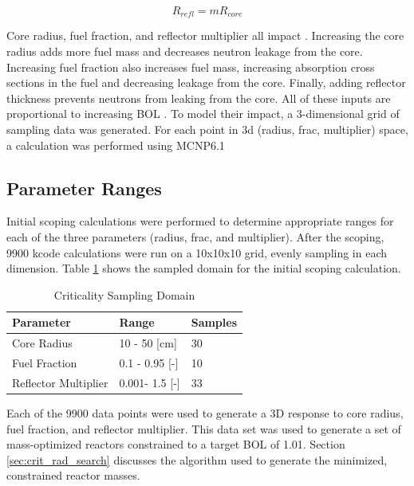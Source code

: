 \begin{equation}
    \label{eq:ref_mult}
    R_{refl} = mR_{core}
\end{equation}

Core radius, fuel fraction, and reflector multiplier all impact \keff.
Increasing the core radius adds more fuel mass and decreases neutron leakage 
from the core. Increasing fuel fraction also increases fuel mass, increasing
absorption cross sections in the fuel and decreasing leakage from the core.
Finally, adding reflector thickness prevents neutrons from leaking from the
core. All of these inputs are proportional to increasing BOL \keff. To model
their impact, a 3-dimensional grid of sampling data was generated. For each
point in 3d (radius, frac, multiplier) space, a \keff calculation was
performed using MCNP6.1


\subsection{Parameter Ranges}
Initial scoping calculations were performed to determine appropriate ranges for
each of the three parameters (radius, frac, and multiplier). After the scoping,
9900 kcode
calculations were run on a 10x10x10 grid, evenly sampling in each dimension.
Table \ref{tab:bol_criticality_1000} shows the sampled domain for the initial
scoping calculation.

\begin{table}[h]
  \centering
  \caption{Criticality Sampling Domain}
  \begin{tabular}{lll}
    \toprule
     Parameter               & Range          & Samples\\ 
    \midrule                                  
     Core Radius             & 10 - 50 [cm]   & 30 \\
     Fuel Fraction 		     & 0.1 - 0.95 [-] & 10 \\
     Reflector Multiplier    & 0.001- 1.5 [-] & 33 \\
  \end{tabular}
  \label{tab:bol_criticality_1000}
\end{table}

Each of the 9900 data points were used to generate a 3D \keff response to
core radius, fuel fraction, and reflector multiplier. This data set was used to
generate a set of mass-optimized reactors constrained to a target BOL \keff of
1.01. Section \ref{sec:crit_rad_search} discusses the algorithm used to generate
the minimized, constrained reactor masses.

